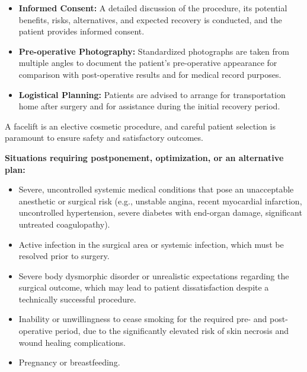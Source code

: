 \begin{itemize}
  \item \textbf{Informed Consent:} A detailed discussion of the procedure, its potential benefits, risks, alternatives, and expected recovery is conducted, and the patient provides informed consent.
  \item \textbf{Pre-operative Photography:} Standardized photographs are taken from multiple angles to document the patient's pre-operative appearance for comparison with post-operative results and for medical record purposes.
  \item \textbf{Logistical Planning:} Patients are advised to arrange for transportation home after surgery and for assistance during the initial recovery period.
\end{itemize}

A facelift is an elective cosmetic procedure, and careful patient selection is paramount to ensure safety and satisfactory outcomes.

\textbf{Situations requiring postponement, optimization, or an alternative plan:}
\begin{itemize}
  \item Severe, uncontrolled systemic medical conditions that pose an unacceptable anesthetic or surgical risk (e.g., unstable angina, recent myocardial infarction, uncontrolled hypertension, severe diabetes with end-organ damage, significant untreated coagulopathy).
  \item Active infection in the surgical area or systemic infection, which must be resolved prior to surgery.
  \item Severe body dysmorphic disorder or unrealistic expectations regarding the surgical outcome, which may lead to patient dissatisfaction despite a technically successful procedure.
  \item Inability or unwillingness to cease smoking for the required pre- and post-operative period, due to the significantly elevated risk of skin necrosis and wound healing complications.
  \item Pregnancy or breastfeeding.
\end{itemize}

